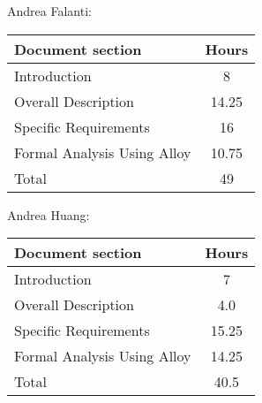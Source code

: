 Andrea Falanti:

\begin{tabular}{|l|c|}
    \hline
    Document section & Hours \\
    \hline
     Introduction & 8\\
     Overall Description & 14.25\\
     Specific Requirements & 16\\
     Formal Analysis Using Alloy & 10.75\\
     \hline
     Total & 49\\
     \hline
\end{tabular}
\vskip 0.3in

Andrea Huang:

\begin{tabular}{|l|c|}
    \hline
    Document section & Hours \\
    \hline
     Introduction &  7\\
     Overall Description & 4.0\\
     Specific Requirements & 15.25\\
     Formal Analysis Using Alloy & 14.25\\
     \hline
     Total & 40.5\\
     \hline
\end{tabular}